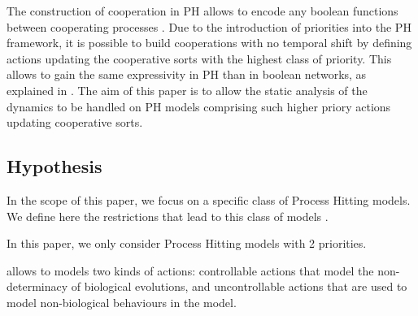The construction of cooperation in PH allows to encode any boolean functions between cooperating processes \cite{PMR10-TCSB}.
Due to the introduction of priorities into the PH framework,
it is possible to build cooperations with no temporal shift by defining actions updating the cooperative sorts with the highest class of priority.
This allows to gain the same expressivity in PH than in boolean networks, as explained in .
The aim of this paper is to allow the static analysis of the dynamics to be handled on PH models comprising such higher priory actions updating cooperative sorts.

\begin{comment}
\begin{example}
The PH in \pref{fig:runningPH-2} results from the refinement of the PH in \pref{fig:runningPH-1}
where several cooperations have been specified.
In particular, the bounce to $a_2$ is the result of a cooperation between $b_1$ and $c_1$; and the
bounce to $a_0$ of a cooperation between $b_0$ and $c_0$.
Hence, this PH expresses a BRN where $a$ requires both $b$ and $c$ active to reach its
highest level, and $a$ does not become inactive unless both $b$ and $c$ are inactive.
\end{example}
\end{comment}



\subsection{Hypothesis} 
\label{ssec:hypothesis}

In the scope of this paper, we focus on a specific class of Process Hitting models.
We define here the restrictions that lead to this class of models .

\begin{criterion}[2 priorities]
\label{cr:2prio}
  In this paper, we only consider Process Hitting models with 2 priorities.
\end{criterion}

 allows to models two kinds of actions: controllable actions that model the non-determinacy of biological evolutions,
and uncontrollable actions that are used to model non-biological behaviours in the model.


